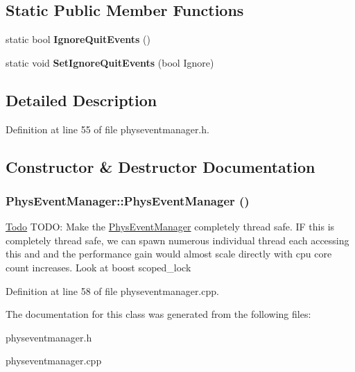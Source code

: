 \subsection*{Static Public Member Functions}
\begin{DoxyCompactItemize}
\item 
\hypertarget{classPhysEventManager_a9783a16342acd71c9a11ade41a2e226b}{
static bool {\bfseries IgnoreQuitEvents} ()}
\label{d5/dd7/classPhysEventManager_a9783a16342acd71c9a11ade41a2e226b}

\item 
\hypertarget{classPhysEventManager_acc902586015a3cd903d14cb20cd51386}{
static void {\bfseries SetIgnoreQuitEvents} (bool Ignore)}
\label{d5/dd7/classPhysEventManager_acc902586015a3cd903d14cb20cd51386}

\end{DoxyCompactItemize}


\subsection{Detailed Description}


Definition at line 55 of file physeventmanager.h.

\subsection{Constructor \& Destructor Documentation}
\hypertarget{classPhysEventManager_a217e7f6006aaf5e08e2872fa4d66e5e2}{
\subsubsection[{PhysEventManager}]{\setlength{\rightskip}{0pt plus 5cm}PhysEventManager::PhysEventManager ()}}
\label{d5/dd7/classPhysEventManager_a217e7f6006aaf5e08e2872fa4d66e5e2}
\begin{Desc}
\item[\hyperlink{todo__todo000003}{Todo}]TODO: Make the \hyperlink{classPhysEventManager}{PhysEventManager} completely thread safe. IF this is completely thread safe, we can spawn numerous individual thread each accessing this and and the performance gain would almost scale directly with cpu core count increases. Look at boost scoped\_\-lock \end{Desc}


Definition at line 58 of file physeventmanager.cpp.

The documentation for this class was generated from the following files:\begin{DoxyCompactItemize}
\item 
physeventmanager.h\item 
physeventmanager.cpp\end{DoxyCompactItemize}
